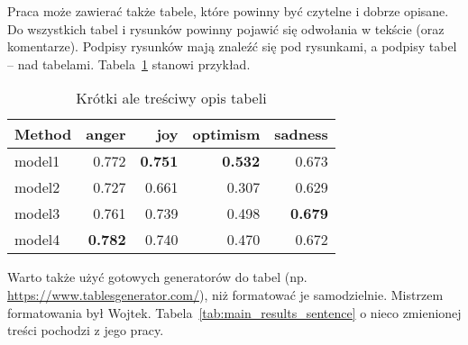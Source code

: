 Praca może zawierać także tabele, które powinny być czytelne i dobrze opisane. Do wszystkich tabel i rysunków powinny pojawić się odwołania w tekście (oraz komentarze). Podpisy rysunków mają znaleźć się pod rysunkami, a podpisy tabel – nad tabelami. Tabela~\ref{tab:tab_example} stanowi przykład. 

\begin{table}[H]
    \centering
        \caption{Krótki ale treściwy opis tabeli} \label{tab:tab_example} 
        \begin{tabular}{lrrrr}
        \toprule
        Method &  anger &   joy &  optimism &  sadness \\
        \midrule
        model1 & 0.772 & \textbf{0.751} & \textbf{0.532} & 0.673 \\
        model2 & 0.727 & 0.661 & 0.307 & 0.629 \\
        model3 & 0.761 & 0.739 & 0.498 & \textbf{0.679} \\
        model4 & \textbf{0.782} & 0.740 & 0.470 & 0.672 \\
        \bottomrule
        \end{tabular}
\end{table}

Warto także użyć gotowych generatorów do tabel (np. \url{https://www.tablesgenerator.com/}), niż formatować je samodzielnie. Mistrzem formatowania był Wojtek. Tabela~\ref{tab:main_results_sentence} o nieco zmienionej treści pochodzi z jego pracy. 

